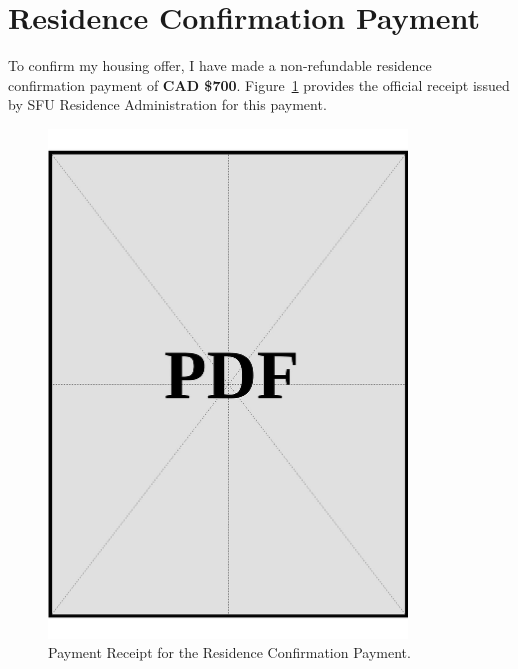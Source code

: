 \section{Residence Confirmation Payment}
\label{sec:residence-confirmation-payment}

\noindent
To confirm my housing offer, I have made a non-refundable residence confirmation payment of \textbf{CAD \$700}. Figure~\ref{fig:residence-payment-receipt} provides the official receipt issued by SFU Residence Administration for this payment.

\vspace*{\fill}
\begin{figure}[h!]
    \centering
    \includegraphics[page=1,width=0.85\textwidth]{../application-docs/applicant/proof-of-housing-arrangement/payment-receipt.pdf}
    \caption{Payment Receipt for the Residence Confirmation Payment.}
    \label{fig:residence-payment-receipt}
\end{figure}
\vspace*{\fill}
\clearpage
